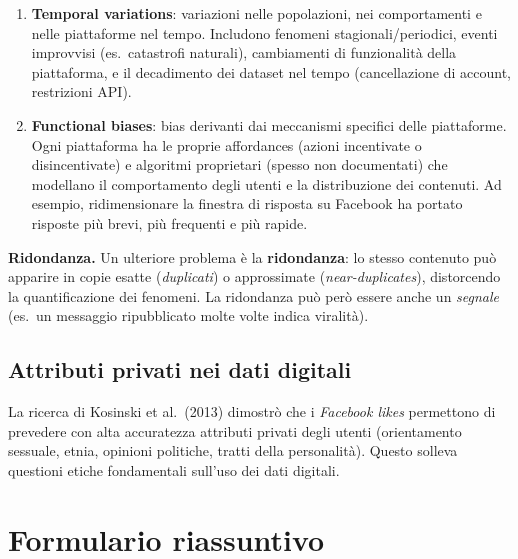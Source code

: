 \documentclass[12pt,a4paper]{article}
\begin{document}
\begin{enumerate}
  \item \textbf{Temporal variations}: variazioni nelle popolazioni, nei comportamenti e
        nelle piattaforme nel tempo. Includono fenomeni stagionali/periodici, eventi
        improvvisi (es.\ catastrofi naturali), cambiamenti di funzionalità della piattaforma,
        e il decadimento dei dataset nel tempo (cancellazione di account, restrizioni API).

  \item \textbf{Functional biases}: bias derivanti dai meccanismi specifici delle
        piattaforme. Ogni piattaforma ha le proprie affordances (azioni incentivate o
        disincentivate) e algoritmi proprietari (spesso non documentati) che modellano il
        comportamento degli utenti e la distribuzione dei contenuti. Ad esempio,
        ridimensionare la finestra di risposta su Facebook ha portato risposte più brevi,
        più frequenti e più rapide.
\end{enumerate}

\textbf{Ridondanza.}
Un ulteriore problema è la \textbf{ridondanza}: lo stesso contenuto può apparire in
copie esatte (\textit{duplicati}) o approssimate (\textit{near-duplicates}), distorcendo
la quantificazione dei fenomeni. La ridondanza può però essere anche un \textit{segnale}
(es.\ un messaggio ripubblicato molte volte indica viralità).

\subsection{Attributi privati nei dati digitali}

La ricerca di Kosinski et al.\ (2013) dimostrò che i \textit{Facebook likes} permettono
di prevedere con alta accuratezza attributi privati degli utenti (orientamento sessuale,
etnia, opinioni politiche, tratti della personalità). Questo solleva questioni etiche
fondamentali sull'uso dei dati digitali.

\appendix
\renewcommand{\thesection}{\Alph{section}}
\section{Formulario riassuntivo}
\end{document}
